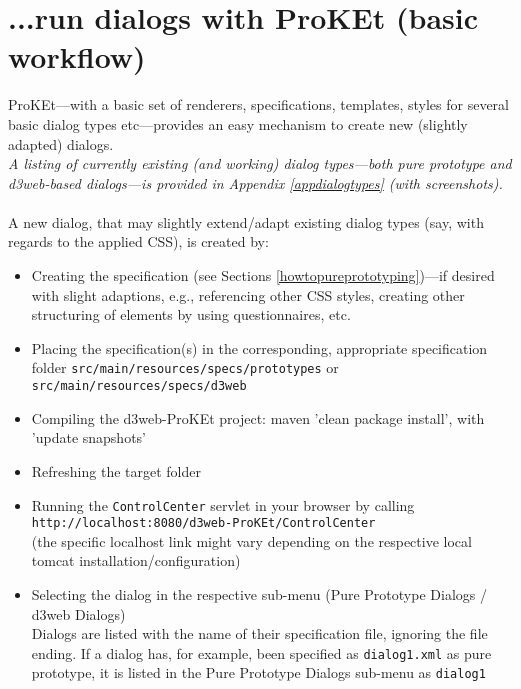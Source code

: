 \documentclass[a4paper,10pt]{scrreprt}
\begin{document}
\section{...run dialogs with ProKEt (basic workflow)}\label{rundialogsbasic}
ProKEt---with a basic set of renderers, specifications, templates, styles for several basic dialog types etc---provides an easy mechanism to create new (slightly adapted) dialogs.\\
\textit{A listing of currently existing (and working) dialog types---both pure prototype and d3web-based dialogs---is provided in Appendix \ref{appdialogtypes} (with screenshots).}\\\\
A new dialog, that may slightly extend/adapt existing dialog types (say, with regards to the applied CSS), is created by:
\begin{itemize}
	\item Creating the specification (see Sections \ref{howtopureprototyping})---if desired with slight adaptions, e.g., referencing other CSS styles, creating other structuring of elements by using questionnaires, etc.
	\item Placing the specification(s) in the corresponding, appropriate specification folder \texttt{src/main/resources/specs/prototypes} or \texttt{src/main/resources/specs/d3web}
	\item Compiling the d3web-ProKEt project: maven 'clean package install', with 'update snapshots'
	\item Refreshing the target folder
	\item Running the \texttt{ControlCenter} servlet in your browser by calling\\
	\texttt{http://localhost:8080/d3web-ProKEt/ControlCenter}\\
	 (the specific localhost link might vary depending on the respective local tomcat installation/configuration)
	\item Selecting the dialog in the respective sub-menu (Pure Prototype Dialogs / d3web Dialogs)\\
	Dialogs are listed with the name of their specification file, ignoring the file ending. 
	If a dialog has, for example, been specified as \texttt{dialog1.xml} as pure prototype, it is listed in the Pure Prototype Dialogs sub-menu as \texttt{dialog1}
\end{itemize} 
\end{document}
